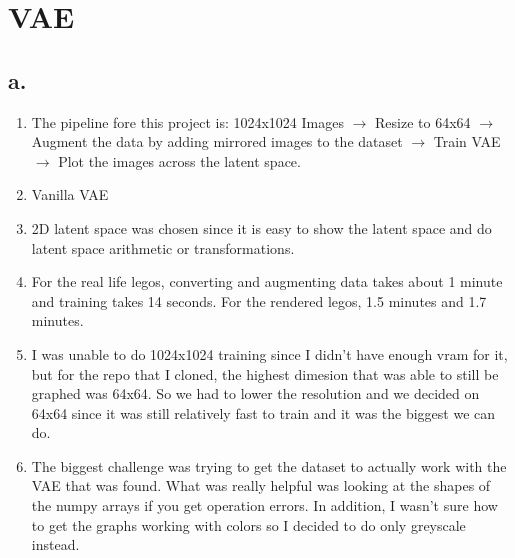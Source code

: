 \documentclass[]{article}
\begin{document}
\clearpage

\section{VAE}
\subsection*{a.}
\begin{enumerate}
  \item The pipeline fore this project is:
        1024x1024 Images $\rightarrow$ Resize to 64x64 $\rightarrow$ Augment the data by adding mirrored
        images to the dataset $\rightarrow$ Train VAE $\rightarrow$ Plot the images across the latent
        space.
  \item Vanilla VAE
  \item 2D latent space was chosen since it is easy 
        to show the latent space and
        do latent space arithmetic or transformations.
  \item For the real life legos, converting and augmenting data takes 
        about 1 minute and training takes 14 seconds.
        For the rendered legos, 1.5 minutes and 1.7 minutes.
  \item I was unable to do 1024x1024 training since I didn't have enough vram for it,
        but for the repo that I cloned, the highest dimesion that was able to still
        be graphed was 64x64. So we had to lower the resolution and we decided on
        64x64 since it was still relatively fast to train and it was the biggest
        we can do.
  \item The biggest challenge was trying to get the dataset to actually
        work with the VAE that was found. What was really helpful was
        looking at the shapes of the numpy arrays if you get operation errors.
        In addition, I wasn't sure how to get the graphs working with colors
        so I decided to do only greyscale instead.
\end{enumerate}
\end{document}
